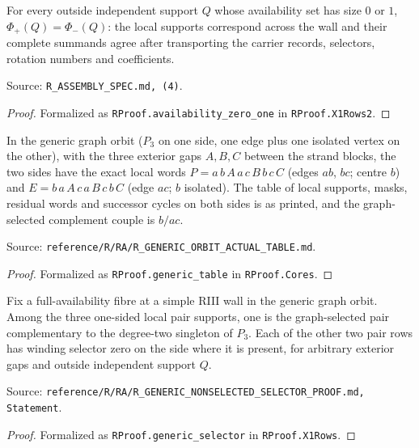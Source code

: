 \begin{obligation}\label{R:availability_0_1}\leanok
For every outside independent support $Q$ whose availability set has size $0$ or $1$, $\Phi_+(Q)=\Phi_-(Q)$: the local
supports correspond across the wall and their complete summands agree after transporting the carrier records, selectors,
rotation numbers and coefficients.

Source: \texttt{R\_ASSEMBLY\_SPEC.md, (4)}.
\end{obligation}
\begin{proof}\leanok{}
Formalized as \texttt{RProof.availability\_zero\_one} in \texttt{RProof.X1Rows2}.
\end{proof}

\begin{obligation}\label{R:generic_table}\leanok
In the generic graph orbit ($P_3$ on one side, one edge plus one isolated vertex on the other), with the three exterior
gaps $A,B,C$ between the strand blocks, the two sides have the exact local words $P=a\,b\,A\,a\,c\,B\,b\,c\,C$ (edges $ab$,
$bc$; centre $b$) and $E=b\,a\,A\,c\,a\,B\,c\,b\,C$ (edge $ac$; $b$ isolated). The table of local supports, masks, residual
words and successor cycles on both sides is as printed, and the graph-selected complement couple is $b/ac$.

Source: \texttt{reference/R/RA/R\_GENERIC\_ORBIT\_ACTUAL\_TABLE.md}.
\end{obligation}
\begin{proof}\leanok{}
Formalized as \texttt{RProof.generic\_table} in \texttt{RProof.Cores}.
\end{proof}

\begin{obligation}\label{R:generic_selector}\leanok
Fix a full-availability fibre at a simple RIII wall in the generic graph orbit. Among the three one-sided local pair
supports, one is the graph-selected pair complementary to the degree-two singleton of $P_3$. Each of the other two pair rows
has winding selector zero on the side where it is present, for arbitrary exterior gaps and outside independent support $Q$.

Source: \texttt{reference/R/RA/R\_GENERIC\_NONSELECTED\_SELECTOR\_PROOF.md, Statement}.
\end{obligation}
\begin{proof}\leanok{}
Formalized as \texttt{RProof.generic\_selector} in \texttt{RProof.X1Rows}.
\end{proof}

